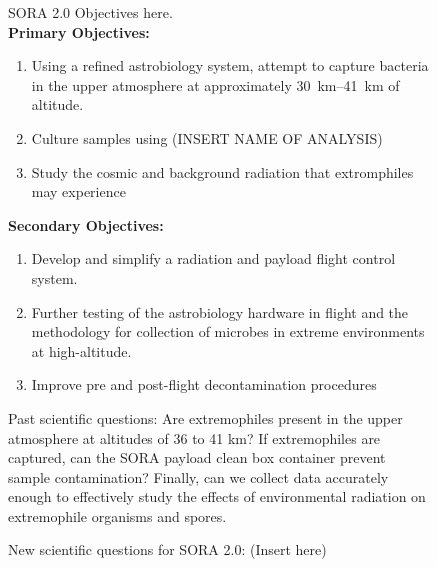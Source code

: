 \begin{figure}[h!]
\begin{center}
SORA 2.0 Objectives here.\\
{\bf Primary Objectives:}
	\begin{enumerate}
	\item Using a refined astrobiology system, attempt to capture bacteria in the upper atmosphere at approximately \SIrange{30}{41}{\kilo\meter} of altitude.
%	
%
	\item Culture samples using (INSERT NAME OF ANALYSIS)
	\item Study the cosmic and background radiation that extromphiles may experience
	\end{enumerate}
%
%
{\bf Secondary Objectives:}
	\begin{enumerate}
	\item Develop and simplify a radiation and payload flight control system.
	\item Further testing of the astrobiology hardware in flight and the methodology for collection of microbes in extreme environments at high-altitude. 
	\item Improve pre and post-flight decontamination procedures
	
	\end{enumerate}

Past scientific questions:
 Are extremophiles present in the upper atmosphere at altitudes of 36 to 41 km?  If extremophiles are captured, can the SORA payload clean box container prevent sample contamination? Finally, can we collect data accurately enough to effectively study the effects of environmental radiation on extremophile organisms and spores.
 
 New scientific questions for SORA 2.0:
(Insert here)


\end{center}
\end{figure}
